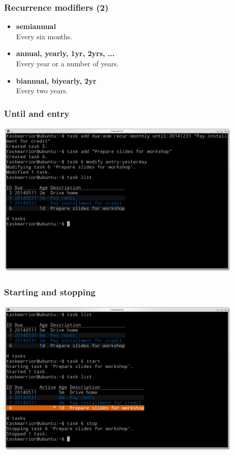 \documentclass[t,handout]{beamer}
\begin{document}
\begin{frame}\frametitle{Recurrence modifiers (2)}
\begin{itemize}
\item \textbf{semiannual} \\
Every six months.
\item \textbf{annual, yearly, 1yr, 2yrs, ...} \\
Every year or a number of years.
\item \textbf{biannual, biyearly, 2yr} \\
Every two years.
\end{itemize}
\end{frame}

\begin{frame}[fragile]\frametitle{Until and entry}
\begin{center} %
\includegraphics[width=11.8cm,height=7.5cm]{until-and-entry.png}
\end{center}
\end{frame}

\begin{frame}[fragile]\frametitle{Starting and stopping}
\begin{center} %
\includegraphics[width=11.8cm,height=7.5cm]{starting-and-stopping.png}
\end{center}
\end{frame}
\end{document}
